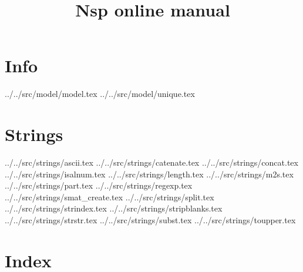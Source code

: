 \documentclass[11pt]{book}
\title{Nsp online manual}
\def\dir{../}
\begin{document}
\maketitle

\tableofcontents

\chapter{Info}

 \dir ../src/model/model.tex 
 \dir ../src/model/unique.tex 

\chapter{Strings}

 \dir ../src/strings/ascii.tex
 \dir ../src/strings/catenate.tex
 \dir ../src/strings/concat.tex
 \dir ../src/strings/isalnum.tex
 \dir ../src/strings/length.tex
 \dir ../src/strings/m2s.tex
 \dir ../src/strings/part.tex
 \dir ../src/strings/regexp.tex
 \dir ../src/strings/smat_create.tex
 \dir ../src/strings/split.tex
 \dir ../src/strings/strindex.tex
 \dir ../src/strings/stripblanks.tex
 \dir ../src/strings/strstr.tex
 \dir ../src/strings/subst.tex
 \dir ../src/strings/toupper.tex
\chapter{Index}

\printindex
\end{document}
